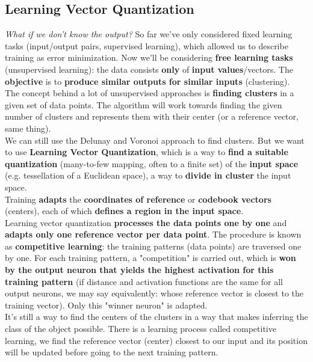 \documentclass[11pt]{article}
\begin{document}
		\newpage
		
		\subsection{Learning Vector Quantization}
		\textit{What if we don't know the output?} So far we've only considered fixed learning tasks (input/output pairs, supervised learning), which allowed us to describe training as error minimization. Now we'll be considering \textbf{free learning tasks} (unsupervised learning): the data consists \textbf{only} of \textbf{input values}/vectors. The \textbf{objective} is to \textbf{produce similar outputs for similar inputs} (clustering).\\
		
		The concept behind a lot of unsupervised approaches is \textbf{finding clusters} in a given set of data points. The algorithm will work towards finding the given number of clusters and represents them with their center (or a reference vector, same thing).\\
		
		We can still use the Delunay and Voronoi approach to find clusters. But we want to use \textbf{Learning Vector Quantization}, which is a way to \textbf{find a suitable quantization} (many-to-few mapping, often to a finite set) of the \textbf{input space} (e.g. tessellation of a Euclidean space), a way to \textbf{divide in cluster} the input space.\\
		
		Training \textbf{adapts} the \textbf{coordinates of reference} or \textbf{codebook vectors} (centers), each of which \textbf{defines a region in the input space}.\\
		
		Learning vector quantization \textbf{processes the data points one by one} and \textbf{adapts only one reference vector per data point}. The procedure is known as \textbf{competitive learning}: the training patterns (data points) are traversed one by one. For each training pattern, a "competition" is carried out, which is \textbf{won by the output neuron that yields the highest activation for this training pattern} (if distance and activation functions are the same for all output neurons, we may say equivalently: whose reference vector is closest to the training vector). Only this "winner neuron" is adapted. \\
		
		It's still a way to find the centers of the clusters in a way that makes inferring the class of the object possible. There is a learning process called competitive learning, we find the reference vector (center) closest to our input and its position will be updated before going to the next training pattern.
		
\end{document}
